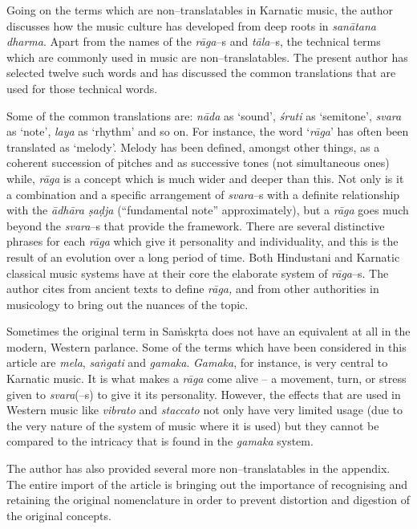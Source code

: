 Going on the terms which are non–translatables in Karnatic music, the author discusses how the music culture has developed from deep roots in \textit{sanātana dharma}. Apart from the names of the \textit{rāga}–s and \textit{tāla}–s, the technical terms which are commonly used in music are non–translatables. The present author has selected twelve such words and has discussed the common translations that are used for those technical words.

Some of the common translations are: \textit{nāda} as ‘sound’, \textit{śruti} as ‘semitone’, \textit{svara} as ‘note’, \textit{laya} as ‘rhythm’ and so on. For instance, the word ‘\textit{rāga}’ has often been translated as ‘melody’. Melody has been defined, amongst other things, as a coherent succession of pitches and as successive tones (not simultaneous ones) while, \textit{rāga} is a concept which is much wider and deeper than this. Not only is it a combination and a specific arrangement of \textit{svara}–s with a definite relationship with the \textit{ādhāra ṣaḍja} (“fundamental note” approximately), but a \textit{rāga} goes much beyond the \textit{svara}–s that provide the framework. There are several distinctive phrases for each \textit{rāga} which give it personality and individuality, and this is the result of an evolution over a long period of time. Both Hindustani and Karnatic classical music systems have at their core the elaborate system of \textit{rāga}–s. The author cites from ancient texts to define \textit{rāga,} and from other authorities in musicology to bring out the nuances of the topic.

Sometimes the original term in Saṁskṛta does not have an equivalent at all in the modern, Western parlance. Some of the terms which have been considered in this article are \textit{mela}, \textit{saṅgati} and \textit{gamaka}. \textit{Gamaka}, for instance, is very central to Karnatic music. It is what makes a \textit{rāga} come alive – a movement, turn, or stress given to \textit{svara}(–s) to give it its personality. However, the effects that are used in Western music like \textit{vibrato} and \textit{staccato} not only have very limited usage (due to the very nature of the system of music where it is used) but they cannot be compared to the intricacy that is found in the \textit{gamaka} system.

The author has also provided several more non–translatables in the appendix. The entire import of the article is bringing out the importance of recognising and retaining the original nomenclature in order to prevent distortion and digestion of the original concepts.

